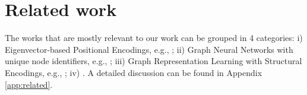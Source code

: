 \section{Related work}
The works that are mostly relevant to our work can be grouped in 4 categories: i) Eigenvector-based Positional Encodings, e.g., \citep{dwivedi2020generalization,rampavsek2022recipe,kreuzer2021rethinking,mialon2021graphitencodinggraphstructure,feldman2022weisfeilerlemaninfinitespectral,huangstability,zhangexpressive}; ii) Graph Neural Networks with unique node identifiers, e.g., \citep{loukas2019graph, abboud2020surprising, sato2021random,abboud2020surprising,sato2021random,eliasof2023graphpositionalencodingrandom}; iii) Graph Representation Learning with Structural Encodings, e.g., \citep{li2020distanceencodingdesignprovably,ying2021transformers, you2019position,you2021identity,dwivedigraph,ma2023graph,kanatsouliscounting}; iv) \citep{wang2022equivariantstablepositionalencoding,srinivasanequivalence,murphy2018janossy}. A detailed discussion can be found in Appendix \ref{app:related}.